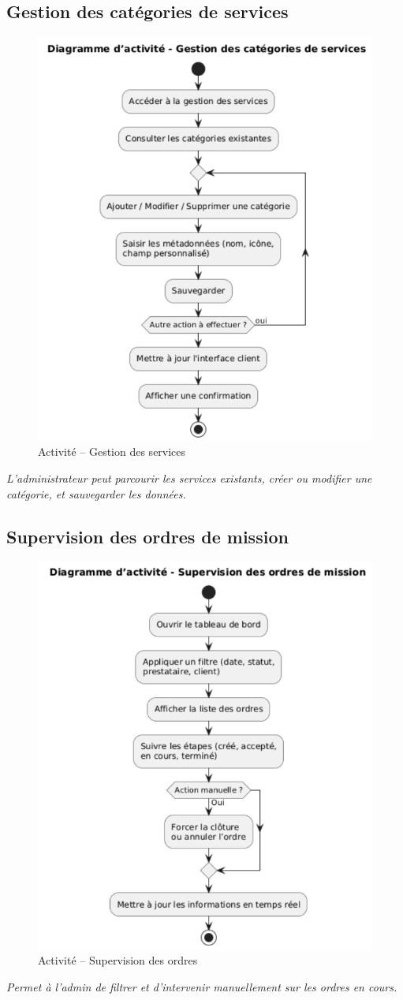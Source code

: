 \subsection*{Gestion des catégories de services}
\begin{figure}[H]
\centering
\includegraphics[width=0.75\linewidth]{figures/gestion des service act.png}
\caption{Activité – Gestion des services}
\end{figure}
\textit{L'administrateur peut parcourir les services existants, créer ou modifier une catégorie, et sauvegarder les données.}

\subsection*{Supervision des ordres de mission}
\begin{figure}[H]
\centering
\includegraphics[width=0.75\linewidth]{figures/supervision des ordres act.png}
\caption{Activité – Supervision des ordres}
\end{figure}
\textit{Permet à l’admin de filtrer et d’intervenir manuellement sur les ordres en cours.}

